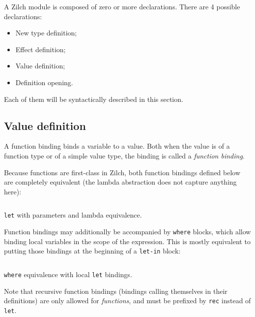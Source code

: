 A Zilch module is composed of zero or more declarations.
There are 4 possible declarations:
\begin{itemize}
	\item New type definition;
	\item Effect definition;
	\item Value definition;
	\item Definition opening.
\end{itemize}

\noindent Each of them will be syntactically described in this section.

\subsection{Value definition}\label{subsec:zilch-grammar-declarations-value}

A function binding binds a variable to a value.
Both when the value is of a function type or of a simple value type, the binding is called a \textit{function binding}.
\vspace*{\baselineskip}

Because functions are first-class in Zilch, both function bindings defined below are completely equivalent (the lambda abstraction does not capture anything here):

\begin{listing}[H]
	\inputminted{\zilchlexer}{examples/function-value-equivalence.zc}

	\captionsetup{style=invisible}
	\caption{\texttt{let} with parameters and lambda equivalence.}
\end{listing}
\vspace*{-\baselineskip}

Function bindings may additionally be accompanied by \verb|where| blocks, which allow binding local variables in the scope of the expression.
This is mostly equivalent to putting those bindings at the beginning of a \verb|let-in| block:

\begin{listing}[H]
	\inputminted{\zilchlexer}{examples/function-where-let-equivalence.zc}

	\captionsetup{style=invisible}
	\caption{\texttt{where} equivalence with local \texttt{let} bindings.}
\end{listing}
\vspace*{-\baselineskip}

Note that recursive function bindings (bindings calling themselves in their definitions) are only allowed for \textit{functions}, and must be prefixed by \verb|rec| instead of \verb|let|.

